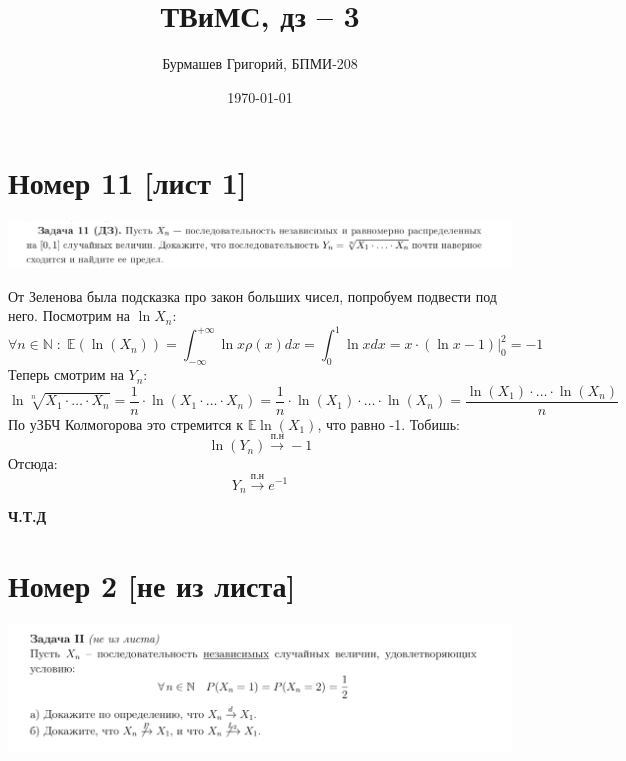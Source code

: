 \documentclass[a4paper,12pt]{article}
\author{Бурмашев Григорий, БПМИ-208}
\title{ТВиМС, дз -- 3}
\date{\today}
\begin{document}
\maketitle
\clearpage
\section*{Номер 11 [лист 1]}
\begin{center}
\includegraphics[scale=0.3]{1.png}
\end{center}
От Зеленова была подсказка про закон больших чисел, попробуем подвести под него. Посмотрим на $\ln X_n$:
\[
\forall n \in \mathbb{N} \; : \; \mathbb{E} \left( \ln (X_n)  \right)= \int_{-\infty}^{+\infty} \ln x \rho(x) dx = \int_{0}^{1} \ln x dx  =
x \cdot \left(\ln x - 1 \right) \Bigg|_0^2
= -1
\]
Теперь смотрим на $Y_n$:
\[
\ln \sqrt[n]{X_1 \cdot \ldots \cdot X_n} = \frac{1}{n} \cdot \ln (X_1 \cdot \ldots \cdot X_n) = \frac{1}{n} \cdot \ln(X_1) \cdot \ldots \cdot \ln (X_n) = \frac{\ln(X_1) \cdot \ldots \cdot \ln (X_n)}{n}
\]
По уЗБЧ Колмогорова это стремится к $\mathbb{E} \ln(X_1)$, что равно -1. Тобишь:
\[
\ln (Y_n) \overset{\text{п.н}}{\longrightarrow} -1
\]
Отсюда:
\[
Y_n \overset{\text{п.н}}{\longrightarrow} e^{-1}
\]
\begin{center}
\textbf{Ч.Т.Д } 
\end{center}
\clearpage
\section*{Номер 2 [не из листа]}
\begin{center}
\includegraphics[scale=0.4]{2.png}
\end{center}
\end{document}
